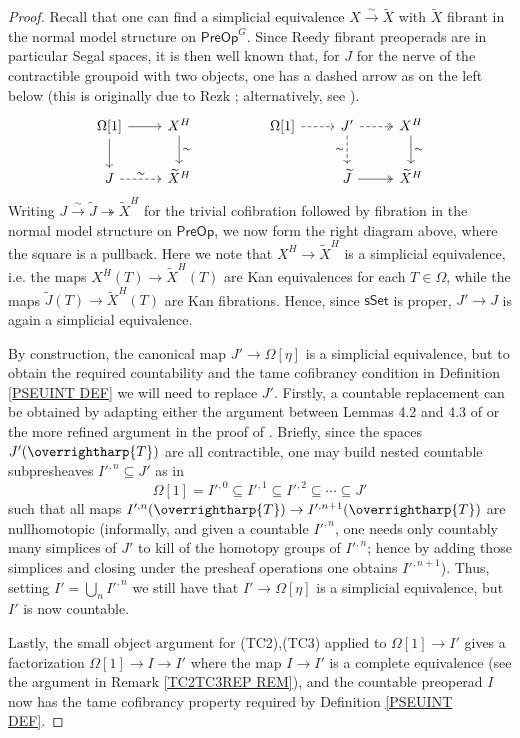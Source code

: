 \documentclass[a4paper,10pt]{article}%
\numberwithin{equation}{section}
\numberwithin{figure}{section}
\theoremstyle{definition} %
\newcommand{\vect}[1]{\text{\overrightharp{\ensuremath{#1}}}}
\newcommand{\1}{\ensuremath{\mathbbm 1}}%
\begin{document}
\begin{proof}
	Recall that one can find a simplicial equivalence
	$X \xrightarrow{\sim} \widetilde{X}$
	with $\widetilde{X}$ fibrant in the normal model structure on 
	$\mathsf{PreOp}^G$.
	Since Reedy fibrant preoperads are in particular
	Segal spaces, it is then well known that,
	for $J$ for the nerve of the contractible groupoid
	with two objects,
	one has a dashed arrow as on the left below
	(this is originally due to 
	Rezk \cite[Thm. 6.2]{Rez01}; 
	alternatively, see \cite[Prop. 5.26(iv)]{BP_edss}).
\[
\begin{tikzcd}
	\Omega[1] \ar{r} \ar{d} 
&
	X^H \ar{d}{\sim}
&&
	\Omega[1] \ar[dashed]{r}
&
	J' \ar[dashed,twoheadrightarrow]{r} \ar[dashed]{d}[swap]{\sim} 
&
	X^H \ar{d}{\sim}
\\
	J \ar[dashed]{r}{\sim}
&
	\widetilde{X}^H
&&&
	\widetilde{J} \ar[twoheadrightarrow]{r}
&
	\widetilde{X}^H
\end{tikzcd}
\]	
Writing 
$J \xrightarrow{\sim} 
\widetilde{J} \twoheadrightarrow 
\widetilde{X}^H$
for the trivial cofibration followed by fibration in the normal model structure
on $\mathsf{PreOp}$,
we now form the right diagram above, 
where the square is a pullback.
Here we note that
$X^H \to \widetilde{X}^H$
is a simplicial equivalence,
i.e. the maps
$X^H(T) \to \widetilde{X}^H(T)$
are Kan equivalences for each $T \in \Omega$,
while the maps 
$\widetilde{J}(T) \to \widetilde{X}^H(T)$
are Kan fibrations.
Hence, 
since $\mathsf{sSet}$ is proper, 
$J' \to J$ is again a simplicial equivalence.

By construction, the canonical map 
$J' \to \Omega[\eta]$
is a simplicial equivalence, 
but to obtain the required 
countability and the tame cofibrancy condition in 
Definition \ref{PSEUINT DEF}
we will need to replace $J'$.
Firstly, a countable replacement can be obtained by adapting
either the argument
between Lemmas 4.2 and 4.3 of
\cite{Ber07}
or the more refined argument in the proof of 
\cite[Lemma 5.1.7]{HSS}.
Briefly, since the spaces $J'(\vect{T})$
are all contractible,
one may build nested
countable subpresheaves
$I'^{,n} \subseteq J'$ as in
\[
\Omega[1] = 
I'^{,0} \subseteq
I'^{,1} \subseteq
I'^{,2} \subseteq
\cdots \subseteq
J'
\]
such that all maps 
$I'^{,n}(\vect{T}) \to I'^{,n+1}(\vect{T})$
are nullhomotopic
(informally, and given a countable $I'^{,n}$, 
one needs only countably many simplices of $J'$
to kill of the homotopy groups of $I'^{,n}$; 
hence by adding those simplices and closing under the presheaf operations one obtains $I'^{,n+1}$).
Thus, setting $I' = \bigcup_{n} I'^{,n}$
we still have that $I' \to \Omega[\eta]$
is a simplicial equivalence, 
but $I'$ is now countable.

Lastly, the small object argument for 
(TC2),(TC3) applied to 
$\Omega[1] \to I'$
gives a factorization 
$\Omega[1] \to I \to I'$
where the map $I \to I'$ is a complete equivalence
(see the argument in Remark \ref{TC2TC3REP REM}),
and the countable preoperad $I$
now has the tame cofibrancy property required by 
Definition \ref{PSEUINT DEF}.
\end{proof}
\end{document}
